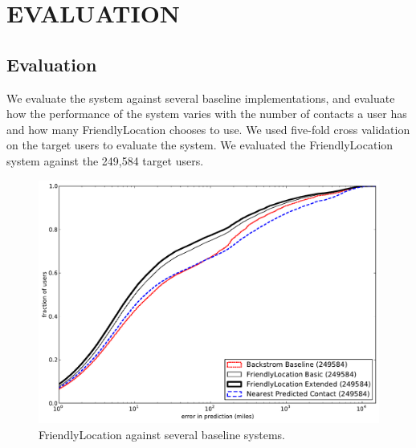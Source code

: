 \ifdefined\THESIS
    \chapter{\uppercase{Evaluation}}
    \label{chap:eval}
\else
    \section{Evaluation}
\fi

We evaluate the system against several baseline implementations, and evaluate
how the performance of the system varies with the number of contacts a user has
and how many FriendlyLocation chooses to use.
We used five-fold cross validation on the target users to evaluate the system.
We evaluated the FriendlyLocation system against the 249,584 target users.


\begin{figure}[tb]
\centering
\includegraphics[width=\linewidth]{figures/fl_basic.pdf}
\caption{
    FriendlyLocation against several baseline systems.
}
\label{fig:baseline}
\end{figure}


